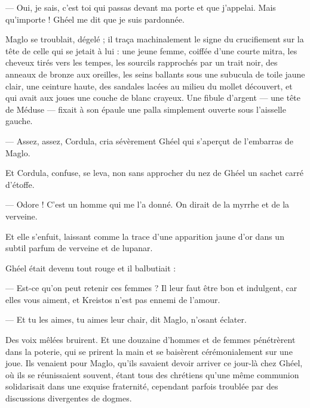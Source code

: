 \documentclass[a4paper, 11pt, oneside, polutonikogreek, french]{article}
\begin{document}
--- Oui, je sais, c'est toi qui passas devant ma porte et que j'appelai. Mais qu'importe ! Ghéel me dit que je suis pardonnée.

Maglo se troublait, dégelé ; il traça machinalement le signe du crucifiement sur la tête de celle qui se jetait à lui : une jeune femme, coiffée d'une courte mitra, les cheveux tirés vers les tempes, les sourcils rapprochés par un trait noir, des anneaux de bronze aux oreilles, les seins ballants sous une subucula de toile jaune clair, une ceinture haute, des sandales lacées au milieu du mollet découvert, et qui avait aux joues une couche de blanc crayeux. Une fibule d'argent --- une tête de Méduse --- fixait à son épaule une palla simplement ouverte sous l'aisselle gauche.

--- Assez, assez, Cordula, cria sévèrement Ghéel qui s'aperçut de l'embarras de Maglo.

Et Cordula, confuse, se leva, non sans approcher du nez de Ghéel un sachet carré d'étoffe.

--- Odore ! C'est un homme qui me l'a donné. On dirait de la myrrhe et de la verveine.

Et elle s'enfuit, laissant comme la trace d'une apparition jaune d'or dans un subtil parfum de verveine et de lupanar.

Ghéel était devenu tout rouge et il balbutiait :

--- Est-ce qu'on peut retenir ces femmes ? Il leur faut être bon et indulgent, car elles vous aiment, et Kreistos n'est pas ennemi de l'amour.

--- Et tu les aimes, tu aimes leur chair, dit Maglo, n'osant éclater.

Des voix mêlées bruirent. Et une douzaine d'hommes et de femmes pénétrèrent dans la poterie, qui se prirent la main et se baisèrent cérémonialement sur une joue. Ils venaient pour Maglo, qu'ils savaient devoir arriver ce jour-là chez Ghéel, où ils se réunissaient souvent, étant tous des chrétiens qu'une même communion solidarisait dans une exquise fraternité, cependant parfois troublée par des discussions divergentes de dogmes.
\end{document}
